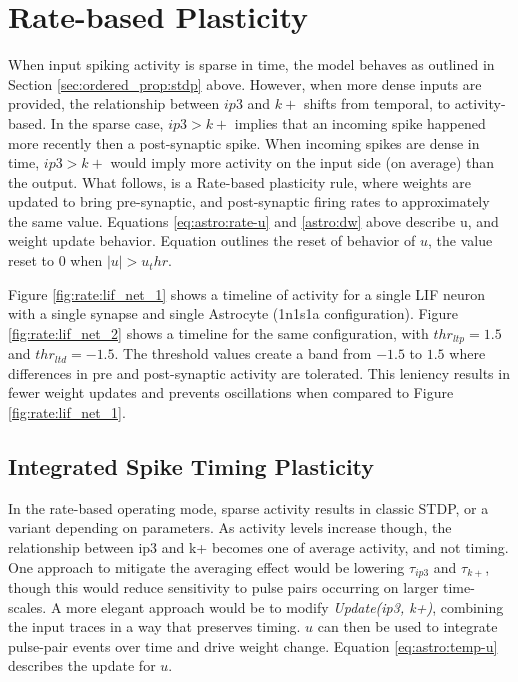     \section{Rate-based Plasticity}

    When input spiking activity is sparse in time, the model behaves as outlined
    in Section \ref{sec:ordered_prop:stdp} above. However, when more dense
    inputs are provided, the relationship between $ip3$ and $k+$ shifts from
    temporal, to activity-based. In the sparse case, $ip3 > k+$ implies that an
    incoming spike happened more recently then a post-synaptic spike. When
    incoming spikes are dense in time, $ip3 > k+$ would imply more activity on
    the input side (on average) than the output. What follows, is a Rate-based
    plasticity rule, where weights are updated to bring pre-synaptic, and
    post-synaptic firing rates to approximately the same value. Equations
    \ref{eq:astro:rate-u} and \ref{astro:dw} above describe u, and
    weight update behavior. Equation \label{eq:astro:u-reset} outlines the reset
    of behavior of $u$, the value reset to $0$ when $|u| > u_thr$.

    Figure \ref{fig:rate:lif_net_1} shows a timeline of activity for a single
    LIF neuron with a single synapse and single Astrocyte (1n1s1a
    configuration). Figure \ref{fig:rate:lif_net_2} shows a timeline for the
    same configuration, with $thr_{ltp}=1.5$ and $thr_{ltd}=-1.5$. The threshold
    values create a band from $-1.5$ to $1.5$ where differences in pre and
    post-synaptic activity are tolerated. This leniency results in fewer weight
    updates and prevents oscillations when compared to Figure
    \ref{fig:rate:lif_net_1}.

    
    
 
    \subsection{Integrated Spike Timing Plasticity}
    
    In the rate-based operating mode, sparse activity results in classic STDP,
    or a variant depending on parameters. As activity levels increase though,
    the relationship between ip3 and k+ becomes one of average activity, and not
    timing. One approach to mitigate the averaging effect would be lowering
    $\tau_{ip3}$ and $\tau_{k+}$, though this would reduce sensitivity to pulse
    pairs occurring on larger time-scales. A more elegant approach would be to
    modify \emph{Update(ip3, k+)}, combining the input traces in a way that
    preserves timing. $u$ can then be used to integrate pulse-pair events over
    time and drive weight change. Equation \ref{eq:astro:temp-u} describes the
    update for $u$.

